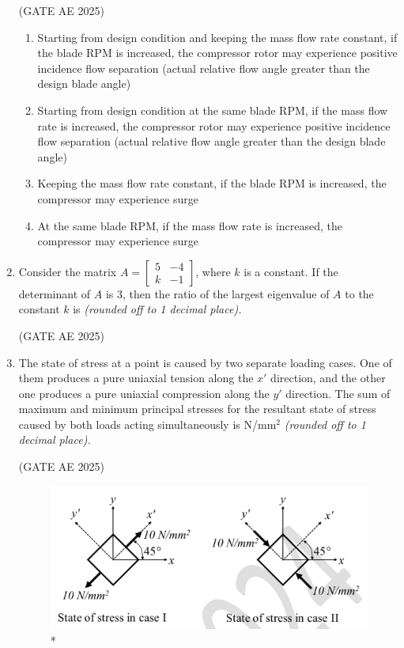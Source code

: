 \documentclass[journal,12pt,onecolumn]{IEEEtran}
\theoremstyle{remark}
\begin{document}
\begin{flushleft}
\begin{enumerate}
\hfill (GATE AE 2025)

\begin{enumerate}
\item Starting from design condition and keeping the mass flow rate constant, if the blade RPM is increased, the compressor rotor may experience positive incidence flow separation (actual relative flow angle greater than the design blade angle)  
\item Starting from design condition at the same blade RPM, if the mass flow rate is increased, the compressor rotor may experience positive incidence flow separation (actual relative flow angle greater than the design blade angle)  
\item Keeping the mass flow rate constant, if the blade RPM is increased, the compressor may experience surge  
\item At the same blade RPM, if the mass flow rate is increased, the compressor may experience surge  
\end{enumerate}

\item Consider the matrix $A = \begin{bmatrix} 5 & -4 \\ k & -1 \end{bmatrix}$, where $k$ is a constant. If the determinant of $A$ is 3, then the ratio of the largest eigenvalue of $A$ to the constant $k$ is \underline{\hspace{3cm}} \textit{(rounded off to 1 decimal place).} 

\hfill (GATE AE 2025)

\item The state of stress at a point is caused by two separate loading cases. One of them produces a pure uniaxial tension along the $x'$ direction, and the other one produces a pure uniaxial compression along the $y'$ direction. The sum of maximum and minimum principal stresses for the resultant state of stress caused by both loads acting simultaneously is \underline{\hspace{3cm}} N/mm$^2$ \textit{(rounded off to 1 decimal place).}

\hfill (GATE AE 2025)

\begin{figure}
\includegraphics[width=0.8\columnwidth]{figs/52.png}
\caption{*}
    \label{fig:placeholder}
\end{figure}



\end{enumerate}
\end{flushleft}
\end{document}
